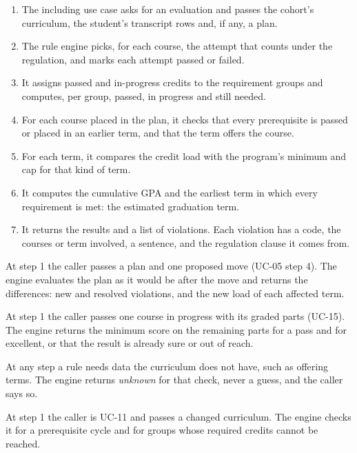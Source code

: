 \begin{enumerate}
  \item The including use case asks for an evaluation and passes the cohort's curriculum, the student's transcript rows
        and, if any, a plan.
  \item The rule engine picks, for each course, the attempt that counts under the regulation, and marks each attempt passed
        or failed.
  \item It assigns passed and in-progress credits to the requirement groups and computes, per group, passed, in progress
        and still needed.
  \item For each course placed in the plan, it checks that every prerequisite is passed or placed in an earlier term, and
        that the term offers the course.
  \item For each term, it compares the credit load with the program's minimum and cap for that kind of term.
  \item It computes the cumulative GPA and the earliest term in which every requirement is met: the estimated graduation
        term.
  \item It returns the results and a list of violations. Each violation has a code, the courses or term involved, a
        sentence, and the regulation clause it comes from.
\end{enumerate}

\begin{altflows}
  \item[A1. Check one change.] At step 1 the caller passes a plan and one proposed move (UC-05 step 4). The engine
        evaluates the plan as it would be after the move and returns the differences: new and resolved violations, and the
        new load of each affected term.
  \item[A2. What a course still needs.] At step 1 the caller passes one course in progress with its graded parts (UC-15).
        The engine returns the minimum score on the remaining parts for a pass and for excellent, or that the result is
        already sure or out of reach.
  \item[A3. Data missing.] At any step a rule needs data the curriculum does not have, such as offering terms. The engine
        returns \emph{unknown} for that check, never a guess, and the caller says so.
  \item[A4. Curriculum check.] At step 1 the caller is UC-11 and passes a changed curriculum. The engine checks it for a
        prerequisite cycle and for groups whose required credits cannot be reached.
\end{altflows}

